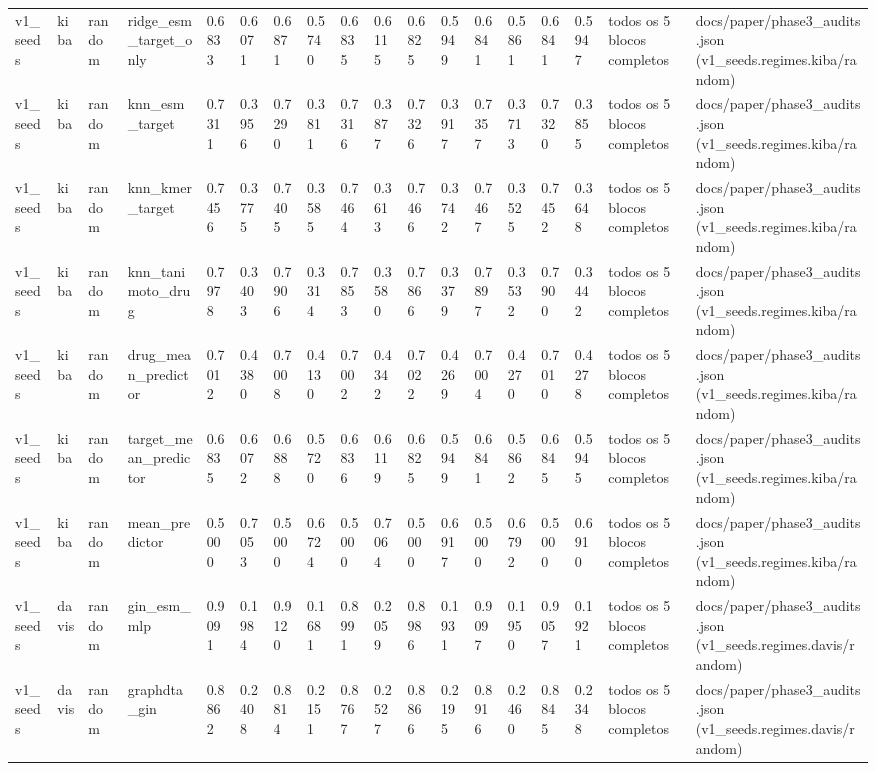\begin{table}[htbp]
\begin{tabular}{llllllllllllllllll}
v1\_seeds & kiba & random & ridge\_esm\_target\_only & 0.6833 & 0.6071 & 0.6871 & 0.5740 & 0.6835 & 0.6115 & 0.6825 & 0.5949 & 0.6841 & 0.5861 & 0.6841 & 0.5947 & todos os 5 blocos completos & docs/paper/phase3\_audits.json (v1\_seeds.regimes.kiba/random) \\
v1\_seeds & kiba & random & knn\_esm\_target & 0.7311 & 0.3956 & 0.7290 & 0.3811 & 0.7316 & 0.3877 & 0.7326 & 0.3917 & 0.7357 & 0.3713 & 0.7320 & 0.3855 & todos os 5 blocos completos & docs/paper/phase3\_audits.json (v1\_seeds.regimes.kiba/random) \\
v1\_seeds & kiba & random & knn\_kmer\_target & 0.7456 & 0.3775 & 0.7405 & 0.3585 & 0.7464 & 0.3613 & 0.7466 & 0.3742 & 0.7467 & 0.3525 & 0.7452 & 0.3648 & todos os 5 blocos completos & docs/paper/phase3\_audits.json (v1\_seeds.regimes.kiba/random) \\
v1\_seeds & kiba & random & knn\_tanimoto\_drug & 0.7978 & 0.3403 & 0.7906 & 0.3314 & 0.7853 & 0.3580 & 0.7866 & 0.3379 & 0.7897 & 0.3532 & 0.7900 & 0.3442 & todos os 5 blocos completos & docs/paper/phase3\_audits.json (v1\_seeds.regimes.kiba/random) \\
v1\_seeds & kiba & random & drug\_mean\_predictor & 0.7012 & 0.4380 & 0.7008 & 0.4130 & 0.7002 & 0.4342 & 0.7022 & 0.4269 & 0.7004 & 0.4270 & 0.7010 & 0.4278 & todos os 5 blocos completos & docs/paper/phase3\_audits.json (v1\_seeds.regimes.kiba/random) \\
v1\_seeds & kiba & random & target\_mean\_predictor & 0.6835 & 0.6072 & 0.6888 & 0.5720 & 0.6836 & 0.6119 & 0.6825 & 0.5949 & 0.6841 & 0.5862 & 0.6845 & 0.5945 & todos os 5 blocos completos & docs/paper/phase3\_audits.json (v1\_seeds.regimes.kiba/random) \\
v1\_seeds & kiba & random & mean\_predictor & 0.5000 & 0.7053 & 0.5000 & 0.6724 & 0.5000 & 0.7064 & 0.5000 & 0.6917 & 0.5000 & 0.6792 & 0.5000 & 0.6910 & todos os 5 blocos completos & docs/paper/phase3\_audits.json (v1\_seeds.regimes.kiba/random) \\
v1\_seeds & davis & random & gin\_esm\_mlp & 0.9091 & 0.1984 & 0.9120 & 0.1681 & 0.8991 & 0.2059 & 0.8986 & 0.1931 & 0.9097 & 0.1950 & 0.9057 & 0.1921 & todos os 5 blocos completos & docs/paper/phase3\_audits.json (v1\_seeds.regimes.davis/random) \\
v1\_seeds & davis & random & graphdta\_gin & 0.8862 & 0.2408 & 0.8814 & 0.2151 & 0.8767 & 0.2527 & 0.8866 & 0.2195 & 0.8916 & 0.2460 & 0.8845 & 0.2348 & todos os 5 blocos completos & docs/paper/phase3\_audits.json (v1\_seeds.regimes.davis/random) \\

\end{tabular}
\end{table}
